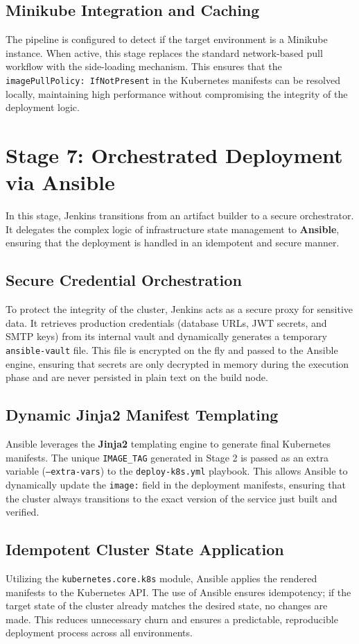 \documentclass[12pt,a4paper]{report}
\begin{document}
\subsection{Minikube Integration and Caching}
The pipeline is configured to detect if the target environment is a Minikube instance. When active, this stage replaces the standard network-based pull workflow with the side-loading mechanism. This ensures that the \texttt{imagePullPolicy: IfNotPresent} in the Kubernetes manifests can be resolved locally, maintaining high performance without compromising the integrity of the deployment logic.

\section{Stage 7: Orchestrated Deployment via Ansible}
In this stage, Jenkins transitions from an artifact builder to a secure orchestrator. It delegates the complex logic of infrastructure state management to \textbf{Ansible}, ensuring that the deployment is handled in an idempotent and secure manner.

\subsection{Secure Credential Orchestration}
To protect the integrity of the cluster, Jenkins acts as a secure proxy for sensitive data. It retrieves production credentials (database URLs, JWT secrets, and SMTP keys) from its internal vault and dynamically generates a temporary \texttt{ansible-vault} file. This file is encrypted on the fly and passed to the Ansible engine, ensuring that secrets are only decrypted in memory during the execution phase and are never persisted in plain text on the build node.

\subsection{Dynamic Jinja2 Manifest Templating}
Ansible leverages the \textbf{Jinja2} templating engine to generate final Kubernetes manifests. The unique \texttt{IMAGE\_TAG} generated in Stage 2 is passed as an extra variable (\texttt{--extra-vars}) to the \texttt{deploy-k8s.yml} playbook. This allows Ansible to dynamically update the \texttt{image:} field in the deployment manifests, ensuring that the cluster always transitions to the exact version of the service just built and verified.

\subsection{Idempotent Cluster State Application}
Utilizing the \texttt{kubernetes.core.k8s} module, Ansible applies the rendered manifests to the Kubernetes API. The use of Ansible ensures idempotency; if the target state of the cluster already matches the desired state, no changes are made. This reduces unnecessary churn and ensures a predictable, reproducible deployment process across all environments.
\end{document}
